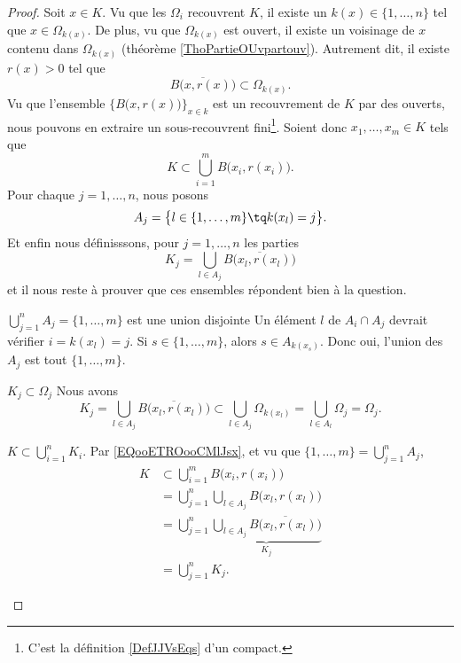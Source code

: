 \begin{proof}
    Soit \( x\in K\). Vu que les \( \Omega_i\) recouvrent \( K\), il existe un \( k(x)\in \{ 1,\ldots, n \}\) tel que \( x\in \Omega_{k(x)}\). De plus, vu que \( \Omega_{k(x)}\) est ouvert, il existe un voisinage de \( x\) contenu dans \( \Omega_{k(x)}\) (théorème \ref{ThoPartieOUvpartouv}). Autrement dit, il existe \( r(x)>0\) tel que
    \begin{equation}        
        \overline{ B\big( x,r(x) \big) }\subset  \Omega_{k(x)}.
    \end{equation}
    Vu que l'ensemble $\{   B\big( x,r(x) \big)    \}_{x\in k}$ est un recouvrement de \( K\) par des ouverts, nous pouvons en extraire un sous-recouvrent fini\footnote{C'est la définition \ref{DefJJVsEqs} d'un compact.}. Soient donc \( x_1,\ldots, x_m\in K\) tels que
    \begin{equation}        \label{EQooETROooCMlJsx}
        K\subset\bigcup_{i=1}^mB\big( x_i, r(x_i) \big).
    \end{equation}
    Pour chaque \( j=1,\ldots, n\), nous posons
    \begin{equation}
        A_j=\big\{ l\in \{ 1,\ldots, m \}\tq k(x_l)=j \big\}.
    \end{equation}
    Et enfin nous définisssons, pour \( j=1,\ldots, n\) les parties
    \begin{equation}
        K_j=\bigcup_{l\in A_j} \overline{ B\big(x_l, r(x_l)\big) }
    \end{equation}
    et il nous reste à prouver que ces ensembles répondent bien à la question.
    \begin{subproof}
    \item[$ \bigcup_{j=1}^n A_j=\{ 1,\ldots, m \}$ est une union disjointe]
        Un élément \( l\) de \( A_i\cap A_j\) devrait vérifier \( i=k(x_l)=j\). Si \( s\in \{ 1,\ldots, m \}\), alors \( s\in A_{k(x_s)}\). Donc oui, l'union des \( A_j\) est tout \( \{ 1,\ldots, m \}\).
    \item[$ K_{j}\subset \Omega_j$]
        Nous avons
        \begin{equation}
            K_j=\bigcup_{l\in A_j}\overline{ B\big( x_l,r(x_l) \big) }\subset  \bigcup_{l\in A_j}\Omega_{k(x_l)}=\bigcup_{l\in A_l}\Omega_{j}=\Omega_j.
        \end{equation}
\item[$K\subset\bigcup_{i=1}^nK_i$.]
    Par \eqref{EQooETROooCMlJsx}, et vu que \( \{ 1,\ldots, m \}=\bigcup_{j=1}^nA_j\),
    \begin{subequations}
        \begin{align}
        K&\subset\bigcup_{i=1}^mB\big( x_i, r(x_i) \big)\\
        &=\bigcup_{j=1}^n\bigcup_{l\in A_j}B\big( x_l,r(x_l) \big)\\
        &=\bigcup_{j=1}^n\underbrace{\bigcup_{l\in A_j}\overline{  B\big( x_l,r(x_l) \big)}}_{K_j}\\
        &=\bigcup_{j=1}^nK_j.
        \end{align}
    \end{subequations}
    \end{subproof}
\end{proof}


